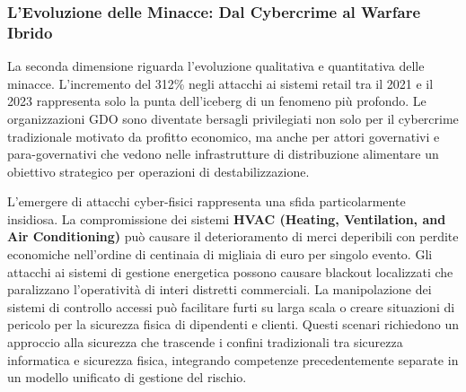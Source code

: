 \subsubsection{L'Evoluzione delle Minacce: Dal Cybercrime al Warfare Ibrido}

La seconda dimensione riguarda l'evoluzione qualitativa e quantitativa delle minacce. L'incremento del 312\% negli attacchi ai sistemi retail tra il 2021 e il 2023\autocite{enisa2024retail} rappresenta solo la punta dell'iceberg di un fenomeno più profondo. Le organizzazioni GDO sono diventate bersagli privilegiati non solo per il cybercrime tradizionale motivato da profitto economico, ma anche per attori governativi e para-governativi che vedono nelle infrastrutture di distribuzione alimentare un obiettivo strategico per operazioni di destabilizzazione.

L'emergere di attacchi cyber-fisici rappresenta una sfida particolarmente insidiosa. La compromissione dei sistemi \textbf{HVAC (Heating, Ventilation, and Air Conditioning) }può causare il deterioramento di merci deperibili con perdite economiche nell'ordine di centinaia di migliaia di euro per singolo evento. Gli attacchi ai sistemi di gestione energetica possono causare blackout localizzati che paralizzano l'operatività di interi distretti commerciali. La manipolazione dei sistemi di controllo accessi può facilitare furti su larga scala o creare situazioni di pericolo per la sicurezza fisica di dipendenti e clienti. Questi scenari richiedono un approccio alla sicurezza che trascende i confini tradizionali tra sicurezza informatica e sicurezza fisica, integrando competenze precedentemente separate in un modello unificato di gestione del rischio.

